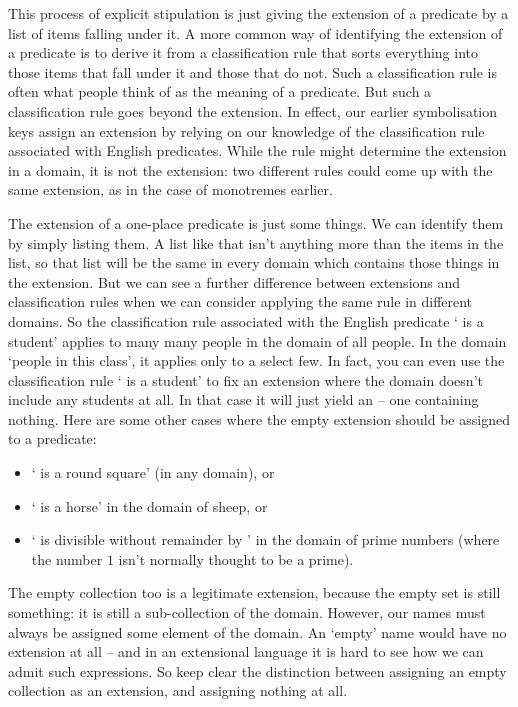 This process of explicit stipulation is just giving the extension of a predicate by a list of items falling under it. A more common way of identifying the extension of a predicate is to derive it from a classification rule that sorts everything into those items that fall under it and those that do not. Such a classification rule is often what people think of as the meaning of a predicate. But such a classification rule goes beyond the extension. In effect, our earlier symbolisation keys assign an extension by relying on our knowledge of the classification rule associated with English predicates. While the rule might determine the extension in a domain, it is not the extension: two different rules could come up with the same extension, as in the case of monotremes earlier. 

The extension of a one-place predicate is just some things. We can identify them by simply listing them. A list like that isn't anything more than the items in the list, so that list will be the same in every domain which contains those things in the extension. But we can see a further difference between extensions and classification rules when we can consider applying the same rule in different domains. So the classification rule associated with the English predicate `\gap{} is a student' applies to many many people in the domain of all people. In the domain `people in this class', it applies only to a select few. In fact, you can even use the classification rule `\gap{} is a student' to fix an extension where the domain doesn't include any students at all. In that case it will just yield an  – one containing nothing. Here are some other cases where the empty extension should be assigned to a predicate:  \begin{itemize}
	\item ` is a round square' (in any domain), or
	\item  ` is a horse' in the domain of sheep, or
	\item ` is divisible without remainder by ' in the domain of prime numbers (where the number $1$ isn't normally thought to be a prime).
\end{itemize}

The empty collection too is a legitimate extension, because the empty set is still something: it is still a sub-collection of the domain. However, our names must always be assigned some element of the domain. An `empty' name would have no extension at all – and in an extensional language it is hard to see how we can admit such expressions. So keep clear the distinction between assigning an empty collection as an extension, and assigning nothing at all.  

